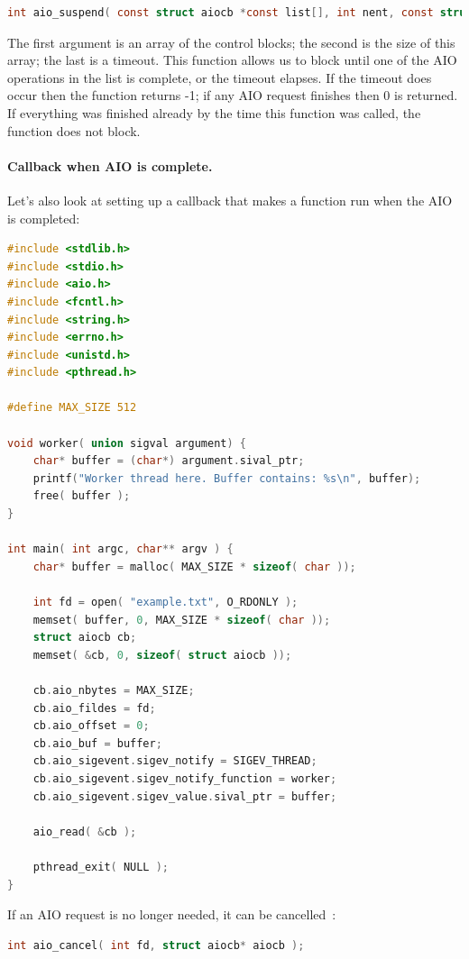 \documentclass[a4paper]{report}
\begin{document}
\begin{lstlisting}[language=C]
int aio_suspend( const struct aiocb *const list[], int nent, const struct timespec* timeout );
\end{lstlisting}

The first argument is an array of the control blocks; the second is the size of this array; the last is a timeout. This function allows us to block until one of the AIO operations in the list is complete, or the timeout elapses. If the timeout does occur then the function returns -1; if any AIO request finishes then 0 is returned. If everything was finished already by the time this function was called, the function does not block.

\paragraph{Callback when AIO is complete.} Let's also look at setting up a callback that makes a function run when the AIO is completed:

\begin{lstlisting}[language=C]
#include <stdlib.h>
#include <stdio.h>
#include <aio.h>
#include <fcntl.h>
#include <string.h>
#include <errno.h>
#include <unistd.h>
#include <pthread.h>

#define MAX_SIZE 512

void worker( union sigval argument) {
    char* buffer = (char*) argument.sival_ptr;
    printf("Worker thread here. Buffer contains: %s\n", buffer);
    free( buffer );
}

int main( int argc, char** argv ) {
    char* buffer = malloc( MAX_SIZE * sizeof( char ));

    int fd = open( "example.txt", O_RDONLY );
    memset( buffer, 0, MAX_SIZE * sizeof( char ));
    struct aiocb cb;
    memset( &cb, 0, sizeof( struct aiocb ));

    cb.aio_nbytes = MAX_SIZE;
    cb.aio_fildes = fd;
    cb.aio_offset = 0;
    cb.aio_buf = buffer;
    cb.aio_sigevent.sigev_notify = SIGEV_THREAD;
    cb.aio_sigevent.sigev_notify_function = worker;
    cb.aio_sigevent.sigev_value.sival_ptr = buffer;

    aio_read( &cb );
    
    pthread_exit( NULL );
}
\end{lstlisting}


If an AIO request is no longer needed, it can be cancelled~\cite{apunix}:
\begin{lstlisting}[language=C]
int aio_cancel( int fd, struct aiocb* aiocb );
\end{lstlisting}
\end{document}

